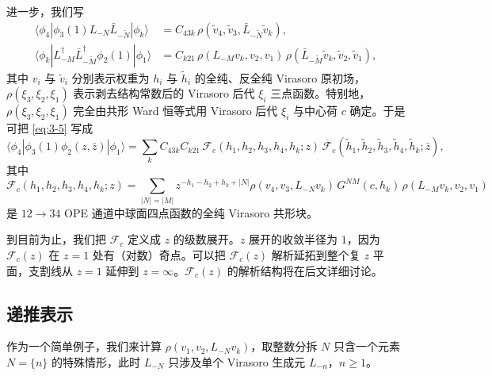 进一步，我们写
\begin{equation}\label{eq:3-7}
  \begin{aligned}
    \langle\phi_4|\phi_3(1)L_{-N}\bar L_{-\tilde N}|\phi_k\rangle
    &=C_{43k}\,\rho(\tilde v_4,\tilde v_3,\bar L_{-\tilde N}\tilde v_k),\\
    \langle\phi_k|L^\dagger_{-M}\bar L^\dagger_{-\tilde M}\phi_2(1)|\phi_1\rangle
    &=C_{k21}\,\rho(L_{-M}v_k,v_2,v_1)\,
      \rho(\bar L_{-\tilde M}\tilde v_k,\tilde v_2,\tilde v_1),
  \end{aligned}
\end{equation}
其中 $v_i$ 与 $\tilde v_i$ 分别表示权重为 $h_i$ 与 $\tilde h_i$ 的全纯、反全纯 Virasoro 原初场，$\rho(\xi_3,\xi_2,\xi_1)$ 表示剥去结构常数后的 Virasoro 后代 $\xi_i$ 三点函数。特别地，$\rho(\xi_3,\xi_2,\xi_1)$ 完全由共形 Ward 恒等式用 Virasoro 后代 $\xi_i$ 与中心荷 $c$ 确定。于是可把 \eqref{eq:3-5} 写成
\begin{equation}\label{eq:3-8}
  \langle\phi_4|\phi_3(1)\phi_2(z,\bar z)|\phi_1\rangle
  =\sum_k C_{43k}C_{k21}\,
  \mathcal F_c(h_1,h_2,h_3,h_4,h_k;z)\,
  \overline{\mathcal F}_c(\tilde h_1,\tilde h_2,\tilde h_3,\tilde h_4,\tilde h_k;\bar z),
\end{equation}
其中
\begin{equation}\label{eq:3-9}
  \mathcal F_c(h_1,h_2,h_3,h_4,h_k;z)
  =\sum_{|N|=|M|} z^{-h_1-h_2+h_k+|N|}
  \rho(v_4,v_3,L_{-N}v_k)\,
  G^{NM}(c,h_k)\,\rho(L_{-M}v_k,v_2,v_1)
\end{equation}
是 $12\to 34$ OPE 通道中球面四点函数的全纯 Virasoro 共形块。

到目前为止，我们把 $\mathcal F_c$ 定义成 $z$ 的级数展开。$z$ 展开的收敛半径为 $1$，因为 $\mathcal F_c(z)$ 在 $z=1$ 处有（对数）奇点。可以把 $\mathcal F_c(z)$ 解析延拓到整个复 $z$ 平面，支割线从 $z=1$ 延伸到 $z=\infty$。$\mathcal F_c(z)$ 的解析结构将在后文详细讨论。

\subsection{递推表示}\label{sec:3-1}

作为一个简单例子，我们来计算 $\rho(v_1,v_2,L_{-N}v_k)$，取整数分拆 $N$ 只含一个元素 $N=\{n\}$ 的特殊情形，此时 $L_{-N}$ 只涉及单个 Virasoro 生成元 $L_{-n}$，$n\ge 1$。


